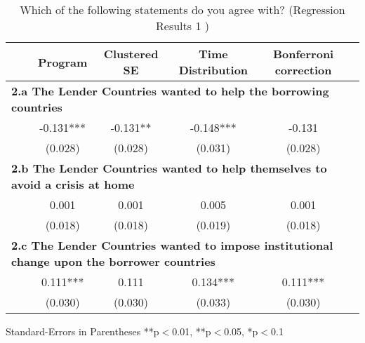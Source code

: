 \begin{table}[h!]

\caption{Which of the following statements do you agree with? (Regression Results 1 )} 
\hskip -2.5cm 
\begin{tabular}{l*{5}{c}}
\hline\hline
\ \  &Program & Clustered SE & Time Distribution & Bonferroni correction \\
\hline
\multicolumn{6}{l}{\textbf{2.a The Lender Countries wanted to help the borrowing countries}} \\
\ \   &-0.131{***}&-0.131{**}&-0.148{***} &-0.131{*** \\ 
&(0.028) & (0.028) & (0.031) & (0.028)  \\ 
\multicolumn{6}{l}{\textbf{2.b The Lender Countries wanted to help themselves to avoid a crisis at home}} \\
\ \  &0.001{}&0.001{}&0.005{}&0.001{} \\ 
&(0.018) & (0.018) & (0.019) & (0.018)   \\
\multicolumn{6}{l}{\textbf{2.c The Lender Countries wanted to impose institutional change upon the borrower countries }} \\
\ \   &0.111{***}&0.111{}&0.134{***} &0.111{***} \\ 
&(0.030) & (0.030) & (0.033) & (0.030) \\
\hline\hline
\end{tabular}
\begin{tablenotes}
\small
\item Standard-Errors in Parentheses \quad  ***p$<$0.01, **p$<$0.05, *p$<$0.1   
\end{tablenotes}
\end{table}
